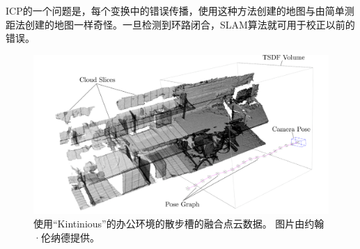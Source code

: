 ICP的一个问题是，每个变换中的错误传播，使用这种方法创建的地图与由简单测距法创建的地图一样奇怪。一旦检测到环路闭合，SLAM算法就可用于校正以前的错误。

\begin{figure}
\centering
\includegraphics[width=\textwidth]{figs/kintinous}
\caption{使用“Kintinious”的办公环境的散步槽的融合点云数据。 图片由约翰·伦纳德提供。}
\label{fig:kintinous}
\end{figure}




